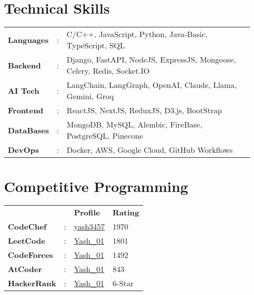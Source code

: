 \documentclass[letterpaper,11pt]{article}
\begin{document}
\begin{minipage}[t]{0.65\textwidth}
  \section{Technical Skills}
  \vspace{1pt}
  \begin{tabular}{>{\raggedright}p{2.1cm} p{0.3cm} p{9.8cm}}
    \textbf{\small{Languages}}  & : & \small{C/C++, JavaScript, Python, Java-Basic, TypeScript, SQL}     \\
    \textbf{\small{Backend}}    & : & \small{Django, FastAPI, NodeJS, ExpressJS, Mongoose, Celery, Redis, Socket.IO}    \\
    \textbf{\small{AI Tech}}    & : & \small{LangChain, LangGraph, OpenAI, Claude, Llama, Gemini, Groq}  \\
    \textbf{\small{Frontend}}   & : & \small{ReactJS, NextJS, ReduxJS, D3.js, BootStrap}               \\
    \textbf{\small{DataBases}}  & : & \small{MongoDB, MySQL, Alembic, FireBase, PostgreSQL, Pinecone}     \\
    \textbf{\small{DevOps}}     & : & \small{Docker, AWS, Google Cloud, GitHub Workflows}            \\
  \end{tabular}
\end{minipage}
\hfill
\begin{minipage}[t]{0.32\textwidth}
  \section{Competitive Programming}
  \raggedleft
  \renewcommand{\arraystretch}{1.1}
  \begin{tabular}{>{\raggedright}p{2.3cm} p{0.3cm} P{1.7cm} P{1.7cm}}
    {}                          & {} & \textbf{\small{Profile}}                                                & \textbf{\small{Rating}}  \\
    \textbf{\small{CodeChef}}   & :  & {\href{https://www.codechef.com/users/yash3457}{{\small{yash3457}}}}    & \small{1970}             \\
    \textbf{\small{LeetCode}}   & :  & {\href{https://leetcode.com/u/Yash_01/}{{\small{Yash\_01}}}}            & \small{1801}             \\
    \textbf{\small{CodeForces}} & :  & {\href{https://codeforces.com/profile/Yash_01}{{\small{Yash\_01}}}}     & \small{1492}             \\
    \textbf{\small{AtCoder}}    & :  & {\href{https://atcoder.jp/users/Yash_01}{{\small{Yash\_01}}}}           & \small{843}              \\
    \textbf{\small{HackerRank}} & :  & {\href{https://www.hackerrank.com/profile/Yash_01}{{\small{Yash\_01}}}} & \small{6-Star}           \\
  \end{tabular}
\end{minipage}
\end{document}
